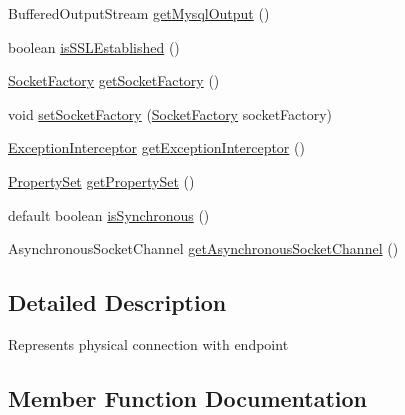 \begin{DoxyCompactItemize}
\item 
Buffered\+Output\+Stream \mbox{\hyperlink{interfacecom_1_1mysql_1_1cj_1_1protocol_1_1_socket_connection_ad71ae367a041cab45e32ec114c97a635}{get\+Mysql\+Output}} ()
\item 
boolean \mbox{\hyperlink{interfacecom_1_1mysql_1_1cj_1_1protocol_1_1_socket_connection_a84f9cb74e6648f4c40650186e5a07c5c}{is\+S\+S\+L\+Established}} ()
\item 
\mbox{\hyperlink{interfacecom_1_1mysql_1_1cj_1_1protocol_1_1_socket_factory}{Socket\+Factory}} \mbox{\hyperlink{interfacecom_1_1mysql_1_1cj_1_1protocol_1_1_socket_connection_a86b6e540d663ad7945c0a69b53cebe66}{get\+Socket\+Factory}} ()
\item 
void \mbox{\hyperlink{interfacecom_1_1mysql_1_1cj_1_1protocol_1_1_socket_connection_af9beff82797b546cca32590719ad2d15}{set\+Socket\+Factory}} (\mbox{\hyperlink{interfacecom_1_1mysql_1_1cj_1_1protocol_1_1_socket_factory}{Socket\+Factory}} socket\+Factory)
\item 
\mbox{\hyperlink{interfacecom_1_1mysql_1_1cj_1_1exceptions_1_1_exception_interceptor}{Exception\+Interceptor}} \mbox{\hyperlink{interfacecom_1_1mysql_1_1cj_1_1protocol_1_1_socket_connection_a4d5027b36a3d4147c685c2a3326fd153}{get\+Exception\+Interceptor}} ()
\item 
\mbox{\hyperlink{interfacecom_1_1mysql_1_1cj_1_1conf_1_1_property_set}{Property\+Set}} \mbox{\hyperlink{interfacecom_1_1mysql_1_1cj_1_1protocol_1_1_socket_connection_a2adfa33e4b622f762a0b6c820621a8a7}{get\+Property\+Set}} ()
\item 
default boolean \mbox{\hyperlink{interfacecom_1_1mysql_1_1cj_1_1protocol_1_1_socket_connection_a89c2521893554b7052f9e92cdd73c527}{is\+Synchronous}} ()
\item 
Asynchronous\+Socket\+Channel \mbox{\hyperlink{interfacecom_1_1mysql_1_1cj_1_1protocol_1_1_socket_connection_acab5267ec9b4013b52015a1d9097066b}{get\+Asynchronous\+Socket\+Channel}} ()
\end{DoxyCompactItemize}


\subsection{Detailed Description}
Represents physical connection with endpoint 

\subsection{Member Function Documentation}
\mbox{\label{interfacecom_1_1mysql_1_1cj_1_1protocol_1_1_socket_connection_ac20aea608e999684c82a0dbaaa5886c7}} 
